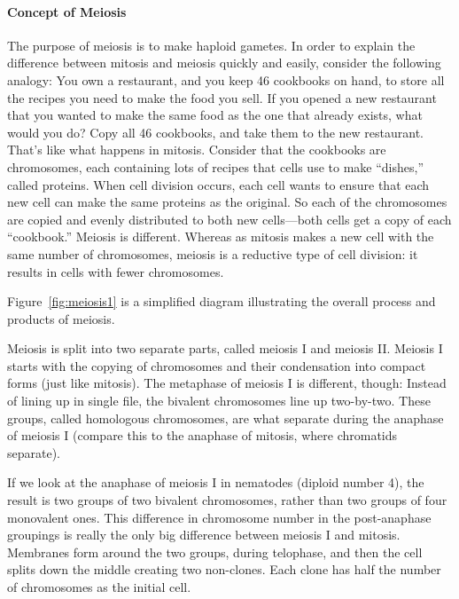 \paragraph{Concept of Meiosis}
The purpose of meiosis is to make haploid gametes. In order to explain the difference between mitosis and meiosis quickly and easily, consider the following analogy: 
You own a restaurant, and you keep 46 cookbooks on hand, to store all the recipes you need to make the food you sell. 
If you opened a new restaurant that you wanted to make the same food as the one that already exists, what would you do? Copy all 46 cookbooks, and take them to the new restaurant. 
That's like what happens in mitosis. Consider that the cookbooks are chromosomes, each containing lots of recipes that cells use to make “dishes,” called proteins.
When cell division occurs, each cell wants to ensure that each new cell can make the same proteins as the original. So each of the chromosomes are copied and evenly distributed to both new cells—both cells get a copy of each “cookbook.”
Meiosis is different. Whereas as mitosis makes a new cell with the same number of chromosomes, meiosis is a reductive type of cell division: it results in cells with fewer chromosomes. 

Figure~\ref{fig:meiosis1} is a simplified diagram illustrating the overall process and products of meiosis.

Meiosis is split into two separate parts, called meiosis I and meiosis II.
Meiosis I starts with the copying of chromosomes and their condensation into compact forms (just like mitosis). 
The metaphase of meiosis I is different, though: Instead of lining up in single file, the bivalent chromosomes line up two-by-two. 
These groups, called homologous chromosomes, are what separate during the anaphase of meiosis I (compare this to the anaphase of mitosis, where chromatids separate). 

If we look at the anaphase of meiosis I in nematodes (diploid number 4), the result is two groups of two bivalent chromosomes, rather than two groups of four monovalent ones. 
This difference in chromosome number in the post-anaphase groupings is really the only big difference between meiosis I and mitosis. 
Membranes form around the two groups, during telophase, and then the cell splits down the middle creating two non-clones. 
Each clone has half the number of chromosomes as the initial cell.

